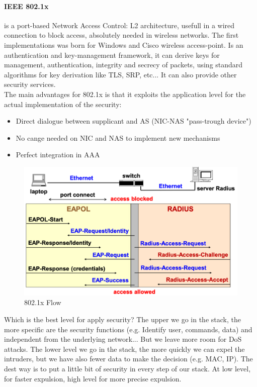 \documentclass[12pt]{article}
\begin{document}
\paragraph{IEEE 802.1x} is a port-based Network Access Control: L2 architecture, usefull in a wired connection to block access, absolutely needed in wireless networks. The first implementations was born for Windows and Cisco wireless access-point. Is an authentication and key-management framework, it can derive keys for management, authentication, integrity and secrecy of packets, using standard algorithms for key derivation like TLS, SRP, etc... It can also provide other security services.\\
The main advantages for 802.1x is that it exploits the application level for the actual implementation of the security:
\begin{itemize}
  \item Direct dialogue between supplicant and AS (NIC-NAS "pass-trough device")
  \item No cange needed on NIC and NAS to implement new mechanisms
  \item Perfect integration in AAA
\end{itemize}
\begin{figure}[H]
   \centering
   \includegraphics[width=\linewidth]{images/802-1x.png}
   \caption{802.1x Flow}
   \label{fig:802-1x}
\end{figure}

Which is the best level for apply security? The upper we go in the stack, the more specific are the security functions (e.g. Identify user, commands, data) and independent from the underlying network... But we leave more room for DoS attacks. The lower level we go in the stack, the more quickly we can expel the intruders, but we have also fewer data to make the decision (e.g. MAC, IP). The dest way is to put a little bit of security in every step of our stack. At low level, for faster expulsion, high level for more precise expulsion.
\end{document}
